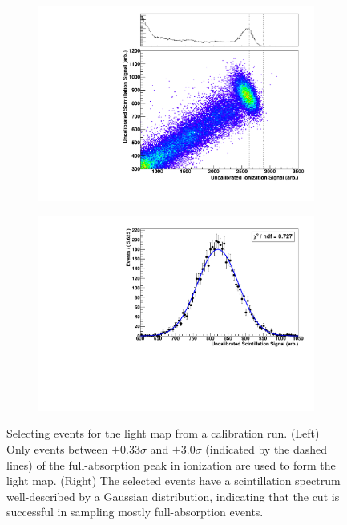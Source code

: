 \documentclass[herrin-thesis.tex]{subfiles}
\begin{document}
\begin{figure}[tbh]
\centering
\begin{subfigure}[b]{0.48\textwidth}
\centering
\includegraphics[width=\textwidth]{./plots/lightmap_ionization_cut.pdf}
\end{subfigure}\hfill%
\begin{subfigure}[b]{0.48\textwidth}
\centering
\includegraphics[width=\textwidth]{./plots/lightmap_scintillation_post_cut.pdf}
\end{subfigure}
\caption[Event selection for the light map]{Selecting events for the light map from a  calibration run. (Left) Only events between \(+0.33\sigma\) and \(+3.0\sigma\) (indicated by the dashed lines) of the full-absorption peak in ionization are used to form the light map. (Right) The selected events have a scintillation spectrum well-described by a Gaussian distribution, indicating that the cut is successful in sampling mostly full-absorption events.}
\label{fig:lightmap_event_selection}
\end{figure}
\end{document}
